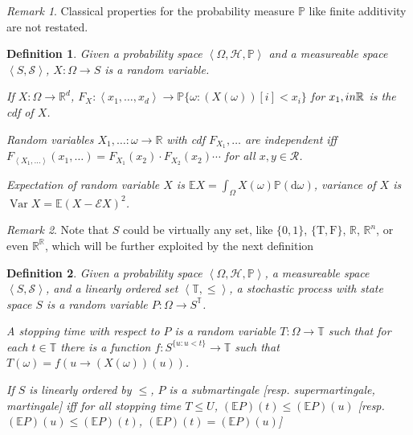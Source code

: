 \documentclass{book}
\newtheorem{definition}{Definition}
\theoremstyle{definition}\newtheorem{mechanism}{Mechanism}
\theoremstyle{remark}\newtheorem*{remark}{Remark}
\DeclareMathOperator*{\Var}{Var}
\newcommand{\true}{\mathrm{T}}
\newcommand{\false}{\mathrm{F}}
\begin{document}
\begin{remark}
	Classical properties for the probability measure $\mathbb P$ like finite additivity are not restated.
\end{remark}

\begin{definition}
	Given a probability space $\left<\Omega, \mathcal H, \mathbb P\right>$ and a measureable space $\left<S, \mathcal S\right>$, $X: \Omega \to S$ is a random variable.
	
	If $X: \Omega\to \mathbb R^d$, $F_X: \left<x_1, \dots, x_d\right> \to \mathbb P\{\omega: (X(\omega))[i] < x_i\}$ for $x_1, \\in \mathbb R$ is the cdf of $X$.	
	
	Random variables $X_1, \dots: \omega\to \mathbb R$ with cdf $F_{X_1}, \dots$ are independent iff $F_{\left<X_1, \dots\right>}(x_1, \dots) = F_{X_1}(x_2)\cdot F_{X_2}(x_2)\cdots$ for all $x, y\in \mathcal R$.
	
	Expectation of random variable $X$ is $\mathbb EX = \int_\Omega X(\omega) \mathbb P(\mathrm d\omega)$, variance of $X$ is $\Var X = \mathbb E(X - \mathcal E X)^2$.
\end{definition}

\begin{remark}
	Note that $S$ could be virtually any set, like $\{0, 1\}$, $\{\true, \false\}$, $\mathbb R$, $\mathbb R^n$, or even $\mathbb R^{\mathbb R}$, which will be further exploited by the next definition
\end{remark}

\begin{definition}
	Given a probability space $\left<\Omega, \mathcal H, \mathbb P\right>$, a measureable space $\left<S, \mathcal S\right>$, and a linearly ordered set $\left<\mathbb T, \le\right>$, a stochastic process with state space $S$ is a random variable $P: \Omega\to S^{\mathbb T}$.
	
	A stopping time with respect to $P$ is a random variable $T: \Omega\to \mathbb T$ such that for each $t\in \mathbb T$ there is a function $f: S^{\{u: u< t\}}\to \mathbb T$ such that $T(\omega) = f(u\to (X(\omega))(u))$.
	
	If $S$ is linearly ordered by $\leq$, $P$ is a submartingale [resp. supermartingale, martingale] iff for all stopping time $T\le U$, $(\mathbb EP)(t)\leq  (\mathbb EP)(u)$ [resp. $(\mathbb EP)(u)\leq  (\mathbb EP)(t)$, $(\mathbb EP)(t) =  (\mathbb EP)(u)$]
\end{definition}
\end{document}
